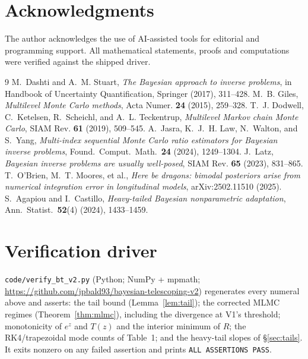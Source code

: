 \documentclass[11pt]{article}
\theoremstyle{definition}
\theoremstyle{remark}
\begin{document}
\section*{Acknowledgments}
The author acknowledges the use of AI-assisted tools for editorial and programming support. All
mathematical statements, proofs and computations were verified against the shipped driver.

\begin{thebibliography}{9}
 M.~Dashti and A.~M. Stuart, \emph{The Bayesian approach to inverse problems}, in
  Handbook of Uncertainty Quantification, Springer (2017), 311--428.
 M.~B. Giles, \emph{Multilevel Monte Carlo methods}, Acta Numer. \textbf{24} (2015),
  259--328.
 T.~J. Dodwell, C.~Ketelsen, R.~Scheichl, and A.~L. Teckentrup, \emph{Multilevel
  Markov chain Monte Carlo}, SIAM Rev. \textbf{61} (2019), 509--545.
 A.~Jasra, K.~J.~H. Law, N.~Walton, and S.~Yang, \emph{Multi-index sequential Monte
  Carlo ratio estimators for Bayesian inverse problems}, Found.\ Comput.\ Math.\ \textbf{24} (2024),
  1249--1304.
 J.~Latz, \emph{Bayesian inverse problems are usually well-posed}, SIAM Rev.
  \textbf{65} (2023), 831--865.
 T.~O'Brien, M.~T. Moores, et al., \emph{Here be dragons: bimodal posteriors arise
  from numerical integration error in longitudinal models}, arXiv:2502.11510 (2025).
 S.~Agapiou and I.~Castillo, \emph{Heavy-tailed Bayesian nonparametric adaptation},
  Ann.\ Statist.\ \textbf{52}(4) (2024), 1433--1459.
\end{thebibliography}

\appendix
\section{Verification driver}\label{app:code}
\texttt{code/verify\_bt\_v2.py} (Python; NumPy + mpmath;
\url{https://github.com/jpbald93/bayesian-telescoping-v2}) regenerates every numeral above and asserts:
the tail bound (Lemma~\ref{lem:tail}); the corrected MLMC regimes (Theorem~\ref{thm:mlmc}), including
the divergence at V1's threshold; monotonicity of $e^z$ and $T(z)$ and the interior minimum of $R$;
the RK4/trapezoidal mode counts of Table~1; and the heavy-tail slopes of \S\ref{sec:tails}. It exits
nonzero on any failed assertion and prints \texttt{ALL ASSERTIONS PASS}.
\end{document}
